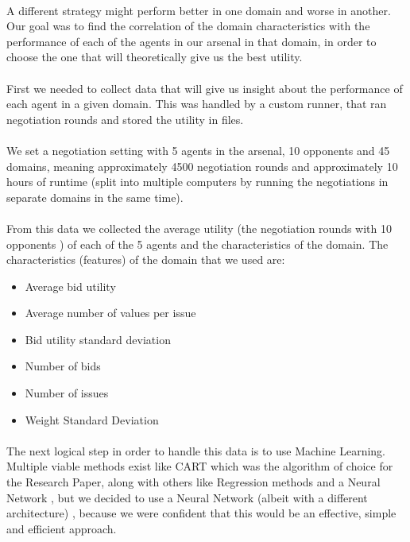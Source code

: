\paragraph{}
A different strategy might perform better in one domain and worse in another.
Our goal was to find the correlation of the domain characteristics with the performance of each of the agents in our arsenal in that domain, in order to choose the one that will theoretically give us the best utility. 

\paragraph{}
 First we needed to collect data that will give us insight about the performance of each agent in a given domain. 
 This was handled by a custom runner, that ran negotiation rounds and stored the utility in files.
 \paragraph{}
 We set a negotiation setting with 5 agents in the arsenal, 10 opponents and 45 domains, meaning approximately 4500 negotiation rounds and approximately
10 hours of runtime (split into multiple computers by running the negotiations in separate domains in the same time).
\paragraph{}
 From this data we collected the average utility (the negotiation rounds with 10 opponents ) of each of the 5 agents and the characteristics of the domain. 
 The characteristics (features) of the domain that we used are:
\begin{itemize} \label{list:features}
	\item {Average bid utility} 
	\item {Average number of values per issue}
	\item {Bid utility standard deviation}
	\item {Number of bids}
	\item {Number of issues}
	\item {Weight Standard Deviation}
  
\end{itemize}

\paragraph{}
 The next logical step in order to handle this data is to use Machine Learning. Multiple viable methods exist 
 like CART which was the algorithm of choice for the Research Paper, along with others like Regression methods and a Neural Network , 
 but we decided to use a Neural Network (albeit with a different architecture) , because we were confident that this would be an effective, simple and efficient approach. 
